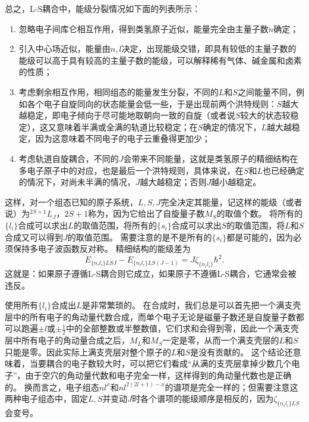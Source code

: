 总之，L-S耦合中，能级分裂情况如下面的列表所示：
\begin{enumerate}
    \item 忽略电子间库仑相互作用，得到类氢原子近似，能量完全由主量子数$n$确定；
    \item 引入中心场近似，能量由$n, l$决定，出现能级交错，即具有较低的主量子数的能级可以高于具有较高的主量子数的能级，可以解释稀有气体、碱金属和卤素的性质；
    \item 考虑剩余相互作用，相同组态的能量发生分裂，不同的$L$和$S$之间能量不同，例如各个电子自旋同向的状态能量会低一些，于是出现前两个洪特规则：$S$越大越稳定，即电子倾向于尽可能地取朝向一致的自旋（或者说$S$较大的状态较稳定），这又意味着半满或全满的轨道比较稳定；在$S$确定的情况下，$L$越大越稳定，因为这意味着不同电子的电子云重叠得更加少；
    \item 考虑轨道自旋耦合，不同的$J$会带来不同能量，这就是类氢原子的精细结构在多电子原子中的对应，也是最后一个洪特规则，具体来说，在$S$和$L$也已经确定的情况下，对尚未半满的情况，$J$越大越稳定；否则$J$越小越稳定。
\end{enumerate}
这样，对一个组态已知的原子系统，$L, S, J$完全决定其能量，记这样的能级（或者说）为$^{2S+1} L_J$，$2S+1$称为，因为它给出了自旋量子数$M_S$的取值个数。
将所有的$\{l_i\}$合成可以求出$L$的取值范围，将所有的$\{s_i\}$合成可以求出$S$的取值范围，将$L$和$S$合成又可以得到$J$的取值范围。
需要注意的是不是所有的$\{s_i\}$都是可能的，因为必须保持多电子波函数反对称。
精细结构的能级差为
\begin{equation}
    E_{\{n_i l_i\} LSJ} - E_{\{n_i l_i\} LS(J-1)} = J \zeta_{\{n_i l_i\}} \hbar^2.
    \label{eq:lande-gapping}
\end{equation}
这就是：如果原子遵循L-S耦合则它成立，如果原子不遵循L-S耦合，它通常会被违反。

使用所有$\{l_i\}$合成出$L$是非常繁琐的。
在合成时，我们总是可以首先把一个满支壳层中的所有电子的角动量代数合成，而单个电子无论是磁量子数还是自旋量子数都可以跑遍$\pm l$或$\pm \frac{1}{2}$中的全部整数或半整数值，它们求和会得到零，因此一个满支壳层中所有电子的角动量合成之后，$M_L$和$M_S$一定是零，从而一个满支壳层的$L$和$S$只能是零。因此实际上满支壳层对整个原子的$L$和$S$是没有贡献的。
这个结论还意味着，当要耦合的电子数较大时，可以把它们看成“从满的支壳层拿掉少数几个电子”，由于空穴的角动量代数和电子完全一样，这样得到的角动量代数也是正确的。
换而言之，电子组态$nl^x$和$nl^{2(2l+1)-x}$的谱项是完全一样的；但需要注意这两种电子组态中，固定$L,S$并变动$J$时各个谱项的能级顺序是相反的，因为$\zeta_{\{n_i l_i\}LS}$会变号。

